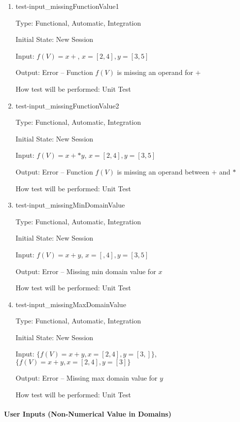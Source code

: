 \documentclass[12pt, titlepage]{article}
\begin{document}
\begin{enumerate}
	
	\item{test-input\_missingFunctionValue1}
	
	Type: Functional, Automatic, Integration
	
	Initial State: New Session
	
	Input: $f(V) = x +$, $x = [2,4], y = [3,5]$
	
	Output: Error -- Function $f(V)$ is missing an operand for $+$
	
	How test will be performed: Unit Test\\
	
	\item{test-input\_missingFunctionValue2}
	
	Type: Functional, Automatic, Integration
	
	Initial State: New Session
	
	Input: $f(V) = x + * y$, $x = [2,4], y = [3,5]$
	
	Output: Error -- Function $f(V)$ is missing an operand between $+$ and $*$
	
	How test will be performed: Unit Test\\
	
	\item{test-input\_missingMinDomainValue}
	
	Type: Functional, Automatic, Integration
	
	Initial State: New Session
	
	Input: $f(V) = x + y$, $x = [,4], y = [3,5]$
	
	Output: Error -- Missing min domain value for $x$
	
	How test will be performed: Unit Test\\
	
	\item{test-input\_missingMaxDomainValue}
	
	Type: Functional, Automatic, Integration
	
	Initial State: New Session
	
	Input: $\{f(V) = x + y, x = [2,4], y = [3,]\}$, $\{f(V) = x + y, x = 
	[2,4], y = [3]\}$
	
	Output: Error -- Missing max domain value for $y$
	
	How test will be performed: Unit Test
	
\end{enumerate}

\paragraph{User Inputs (Non-Numerical Value in Domains)}
\end{document}
